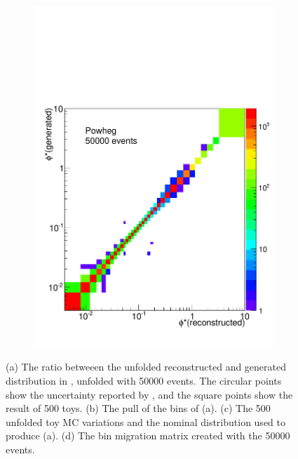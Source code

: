 \begin{figure}[!htbp]
\begin{subfigure}[b]{\SideBySidePlotWidth}
        \includegraphics[width=\textwidth]{figures/BinM_P_50000.pdf}
        \caption{}
        \label{fig:bin_migration_50000}
    \end{subfigure}
    \caption[
        Full uncertainty propegation using \num{50000} \POWHEG events to unfold
        \MADGRAPH.
    ]{
        (a) The ratio betweeen the unfolded reconstructed and generated
        \phistar distribution in \MADGRAPH, unfolded with \num{50000} \POWHEG
        events. The circular points show the uncertainty reported by
        \RooUnfold, and the square points show the result of \num{500} toys.
        (b) The pull of the bins of (a). (c) The \num{500} unfolded toy MC
        variations and the nominal distribution used to produce (a). (d) The
        bin migration matrix created with the \num{50000} \POWHEG events.
    }
\label{fig:50000_propegation_unfolding}
\end{figure}

